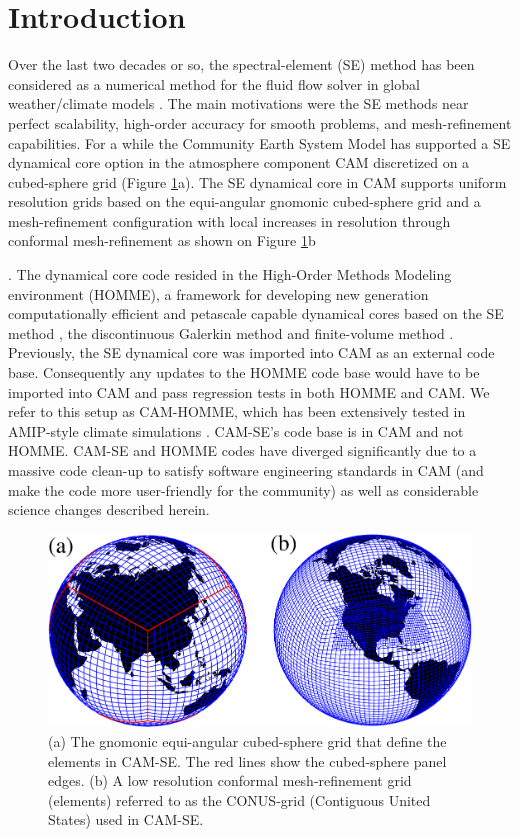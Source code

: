 \documentclass{agujournal}
\begin{document}
\section{Introduction}
Over the last two decades or so, the spectral-element (SE) method has been considered as a numerical method for the fluid flow solver in  global weather/climate models \citep{FT2004MWR,BWTF2006MWR,KG2012JCP,GKC2013SIAM}. The main motivations were the SE methods near perfect scalability, high-order accuracy for smooth problems, and mesh-refinement capabilities. For a while the Community Earth System Model \citep[CESM; ][]{CESM1} has supported a SE dynamical core option in the atmosphere component CAM \citep[Community Atmosphere Model; ][]{CAM5} discretized on a cubed-sphere grid (Figure \ref{fig:grids}a). The SE dynamical core in CAM supports uniform resolution grids based on the equi-angular gnomonic cubed-sphere grid and a mesh-refinement configuration with local increases in resolution through conformal mesh-refinement as shown on Figure \ref{fig:grids}b {\citep{FT2004MWR,BWTF2006MWR,ZJT2013,ZetAl2014JCb}. The dynamical core code resided in the High-Order Methods Modeling environment (HOMME), a framework for developing new generation computationally efficient and petascale capable dynamical cores based on the SE method \citep{TL2000JSC,TES2008JPCS}, the discontinuous Galerkin method \citep{NCT2009CF} and finite-volume method \citep{ELGT2012PCS,LTOUNGK2017MWR}. Previously, the SE dynamical core was imported into CAM as an external code base. Consequently any updates to the HOMME code base would have to be imported into CAM and pass regression tests in both HOMME and CAM. We refer to this setup as CAM-HOMME, which has been extensively tested in AMIP-style climate simulations \citep[e.g., ][]{ELMNTT2012JC,ZJ2014JAMES,RetAl2015GRL,BetAl2016CC,RHUZ2016JAMC,GetAl2017JAMES}. CAM-SE's code base is in CAM and not HOMME. CAM-SE and HOMME codes have diverged significantly due to a  massive code clean-up to satisfy software engineering standards in CAM (and make the code more user-friendly for the community) as well as considerable science changes described herein.
  \begin{figure}[h]
\centering
 \includegraphics[scale=0.45]{figs/grids}
 \caption{(a) The gnomonic equi-angular cubed-sphere grid that define the elements in CAM-SE. The red lines show the cubed-sphere panel edges. (b) A low resolution conformal mesh-refinement grid (elements) referred to as the CONUS-grid (Contiguous United States) used in CAM-SE.}
 \label{fig:grids}
\end{figure}


}
\end{document}
